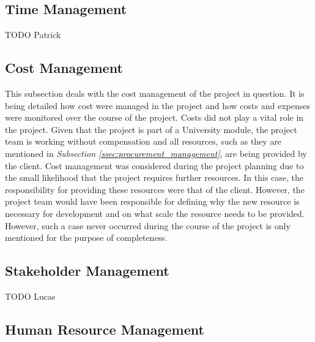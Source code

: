 \subsection{Time Management}
\label{ssec:time_management}

TODO Patrick



\subsection{Cost Management}
\label{ssec:cost_management}

This subsection deals with the cost management of the project in question. It is being detailed how cost were managed in the project and how costs and expenses were monitored over the course of the project.
\newline
Costs did not play a vital role in the project. Given that the project is part of a University module, the project team is working without compensation and all resources, such as they are mentioned in \textit{Subsection \ref{ssec:procurement_management}}, are being provided by the client.
\newline
Cost management was considered during the project planning due to the small likelihood that the project requires further resources. In this case, the responsibility for providing these resources were that of the client. However, the project team would have been responsible for defining why the new resource is necessary for development and on what scale the resource needs to be provided. However, such a case never occurred during the course of the project is only mentioned for the purpose of completeness.



\subsection{Stakeholder Management}
\label{ssec:stakeholder_management}

TODO Lucas



\subsection{Human Resource Management}
\label{ssec:human_resource_management}

